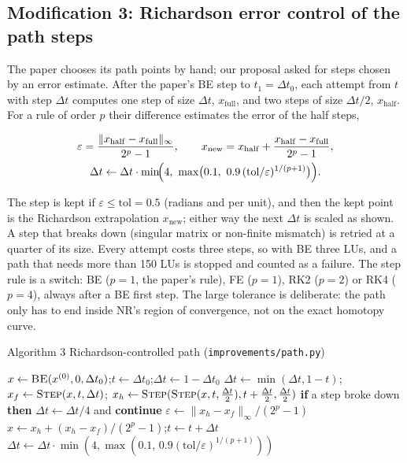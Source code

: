 \documentclass[11pt,a4paper]{article}
\newcommand{\ninf}[1]{\lVert #1\rVert_\infty}
\newcommand{\xo}{x^{(0)}}
\begin{document}
\subsection{Modification 3: Richardson error control of the path steps}\label{sec:richardson}
The paper chooses its path points by hand; our proposal asked for steps chosen by an error estimate. After
the paper's BE step to $t_1=\Delta t_0$, each attempt from $t$ with step $\Delta t$ computes one step of
size $\Delta t$, $x_{\mathrm{full}}$, and two steps of size $\Delta t/2$, $x_{\mathrm{half}}$. For a rule of
order $p$ their difference estimates the error of the half steps,
\begin{keyeq}
\begin{gather}
  \varepsilon = \frac{\ninf{x_{\mathrm{half}}-x_{\mathrm{full}}}}{2^p-1}, \qquad
  x_{\mathrm{new}} = x_{\mathrm{half}} + \frac{x_{\mathrm{half}}-x_{\mathrm{full}}}{2^p-1}, \\
  \Delta t \gets \Delta t\cdot\min\!\Bigl(4,\ \max\bigl(0.1,\ 0.9\,(\mathrm{tol}/\varepsilon)^{1/(p+1)}\bigr)\Bigr).
\end{gather}
\end{keyeq}
The step is kept if $\varepsilon\le\mathrm{tol}=0.5$ (radians and per unit), and then the kept point is
the Richardson extrapolation $x_{\mathrm{new}}$; either way the next $\Delta t$ is scaled as shown. A step
that breaks down (singular matrix or non-finite mismatch) is retried at a quarter of its size. Every
attempt costs three steps, so with BE three LUs, and a path that needs more than 150 LUs is stopped and
counted as a failure. The step rule is a switch: BE ($p=1$, the paper's rule), FE ($p=1$), RK2 ($p=2$) or
RK4 ($p=4$), always after a BE first step. The large tolerance is deliberate: the path only has to end
inside NR's region of convergence, not on the exact homotopy curve.

\begin{algo}{Algorithm 3 \quad Richardson-controlled path (\texttt{improvements/path.py})}
\begin{algorithmic}[1]
\State $x\gets\textsc{BE}(\xo,0,\Delta t_0)$;\quad $t\gets\Delta t_0$;\quad $\Delta t\gets 1-\Delta t_0$
  \State $\Delta t\gets\min(\Delta t,1-t)$;\quad $x_f\gets\textsc{Step}(x,t,\Delta t)$;\quad
         $x_h\gets\textsc{Step}(\textsc{Step}(x,t,\tfrac{\Delta t}{2}),t+\tfrac{\Delta t}{2},\tfrac{\Delta t}{2})$
  \State \textbf{if} a step broke down \textbf{then} $\Delta t\gets\Delta t/4$ and \textbf{continue}
  \State $\varepsilon\gets\ninf{x_h-x_f}/(2^p-1)$
   \State $x\gets x_h+(x_h-x_f)/(2^p-1)$;\quad $t\gets t+\Delta t$ \EndIf
  \State $\Delta t\gets\Delta t\cdot\min(4,\max(0.1,\,0.9(\mathrm{tol}/\varepsilon)^{1/(p+1)}))$
\EndWhile
\end{algorithmic}
\end{algo}
\end{document}
